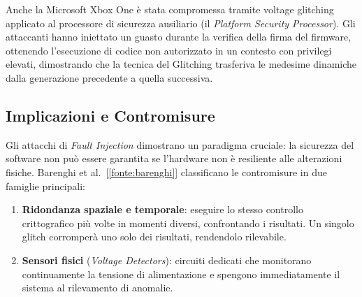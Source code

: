 Anche la Microsoft Xbox One è stata compromessa tramite voltage glitching applicato al processore di sicurezza ausiliario (il \textit{Platform Security Processor}). Gli attaccanti hanno iniettato un guasto durante la verifica della firma del firmware, ottenendo l'esecuzione di codice non autorizzato in un contesto con privilegi elevati, dimostrando che la tecnica del Glitching trasferiva le medesime dinamiche dalla generazione precedente a quella successiva.

\subsection{Implicazioni e Contromisure}

Gli attacchi di \textit{Fault Injection} dimostrano un paradigma cruciale: la sicurezza del software non può essere garantita se l'hardware non è resiliente alle alterazioni fisiche. Barenghi et al.~[\ref{fonte:barenghi}] classificano le contromisure in due famiglie principali:

\begin{enumerate}
    \item \textbf{Ridondanza spaziale e temporale}: eseguire lo stesso controllo crittografico più volte in momenti diversi, confrontando i risultati. Un singolo glitch corromperà uno solo dei risultati, rendendolo rilevabile.
    \item \textbf{Sensori fisici} (\textit{Voltage Detectors}): circuiti dedicati che monitorano continuamente la tensione di alimentazione e spengono immediatamente il sistema al rilevamento di anomalie.
\end{enumerate}